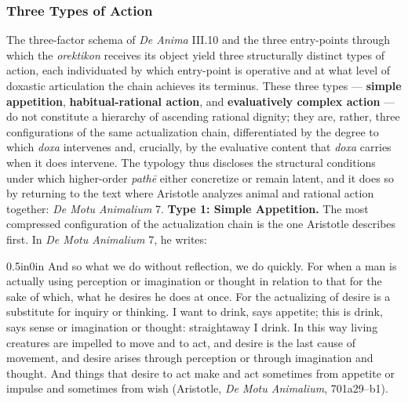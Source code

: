\documentclass{article}
\begin{document}
\subsubsection*{Three Types of Action} The three-factor schema of \textit{De Anima} III.10 and the three entry-points through which the \textit{orektikon} receives its object yield three structurally distinct types of action, each individuated by which entry-point is operative and at what level of doxastic articulation the chain achieves its terminus. These three types --- \textbf{simple appetition}, \textbf{habitual-rational action}, and \textbf{evaluatively complex action} --- do not constitute a hierarchy of ascending rational dignity; they are, rather, three configurations of the same actualization chain, differentiated by the degree to which \textit{doxa} intervenes and, crucially, by the evaluative content that \textit{doxa} carries when it does intervene. The typology thus discloses the structural conditions under which higher-order \textit{path\=e} either concretize or remain latent, and it does so by returning to the text where Aristotle analyzes animal and rational action together: \textit{De Motu Animalium} 7. \textbf{Type 1: Simple Appetition.} The most compressed configuration of the actualization chain is the one Aristotle describes first. In \textit{De Motu Animalium} 7, he writes: \begin{adjustwidth}{0.5in}{0in}
And so what we do without reflection, we do quickly. For when a man is actually using perception or imagination or thought in relation to that for the sake of which, what he desires he does at once. For the actualizing of desire is a substitute for inquiry or thinking. I want to drink, says appetite; this is drink, says sense or imagination or thought: straightaway I drink. In this way living creatures are impelled to move and to act, and desire is the last cause of movement, and desire arises through perception or through imagination and thought. And things that desire to act make and act sometimes from appetite or impulse and sometimes from wish (Aristotle, \textit{De Motu Animalium}, 701a29--b1).

\end{adjustwidth}
\end{document}
